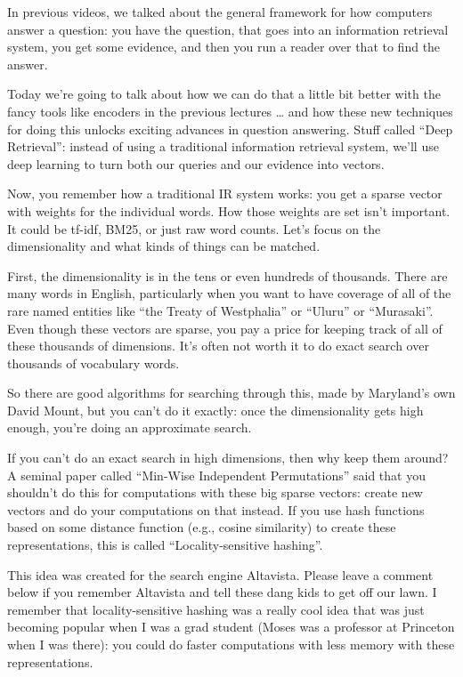 


In previous videos, we talked about the general framework for how computers answer a question: you have the question, that goes into an information retrieval system, you get some evidence, and then you run a reader over that to find the answer.

Today we’re going to talk about how we can do that a little bit better with the fancy tools like encoders in the previous lectures … and how these new techniques for doing this unlocks exciting advances in question answering.  Stuff called “Deep Retrieval”: instead of using a traditional information retrieval system, we’ll use deep learning to turn both our queries and our evidence into vectors.

Now, you remember how a traditional IR system works: you get a sparse vector with weights for the individual words.  How those weights are set isn’t important.  It could be tf-idf, BM25, or just raw word counts.  Let’s focus on the dimensionality and what kinds of things can be matched.

First, the dimensionality is in the tens or even hundreds of thousands.  There are many words in English, particularly when you want to have coverage of all of the rare named entities like “the Treaty of Westphalia” or “Uluru” or “Murasaki”.  Even though these vectors are sparse, you pay a price for keeping track of all of these thousands of dimensions.  It’s often not worth it to do exact search over thousands of vocabulary words.  

So there are good algorithms for searching through this, made by Maryland’s own David Mount, but you can’t do it exactly: once the dimensionality gets high enough, you’re doing an approximate search.  

If you can’t do an exact search in high dimensions, then why keep them around?  A seminal paper called “Min-Wise Independent Permutations” said that you shouldn't do this for computations with these big sparse vectors: create new vectors and do your computations on that instead.  If you use hash functions based on some distance function (e.g., cosine similarity) to create these representations, this is called “Locality-sensitive hashing”.  

This idea was created for the search engine Altavista.  Please leave a comment below if you remember Altavista and tell these dang kids to get off our lawn.  I remember that locality-sensitive hashing was a really cool idea that was just becoming popular when I was a grad student (Moses was a professor at Princeton when I was there): you could do faster computations with less memory with these representations.

